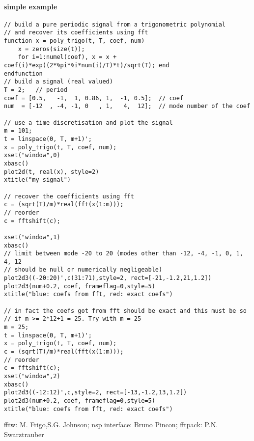 \begin{examples}
 \paragraph{simple example}
  \begin{Verbatim}
// build a pure periodic signal from a trigonometric polynomial
// and recover its coefficients using fft
function x = poly_trigo(t, T, coef, num)
    x = zeros(size(t));
    for i=1:numel(coef), x = x + coef(i)*exp((2*%pi*%i*num(i)/T)*t)/sqrt(T); end
endfunction
// build a signal (real valued)
T = 2;   // period
coef = [0.5,   -1,  1, 0.86, 1,  -1, 0.5];  // coef
num  = [-12  , -4, -1, 0   , 1,   4,  12];  // mode number of the coef

// use a time discretisation and plot the signal
m = 101;
t = linspace(0, T, m+1)';
x = poly_trigo(t, T, coef, num);
xset("window",0)
xbasc()
plot2d(t, real(x), style=2)
xtitle("my signal")

// recover the coefficients using fft
c = (sqrt(T)/m)*real(fft(x(1:m)));
// reorder
c = fftshift(c);

xset("window",1)
xbasc()
// limit between mode -20 to 20 (modes other than -12, -4, -1, 0, 1, 4, 12
// should be null or numerically negligeable)
plot2d3((-20:20)',c(31:71),style=2, rect=[-21,-1.2,21,1.2])
plot2d3(num+0.2, coef, frameflag=0,style=5)
xtitle("blue: coefs from fft, red: exact coefs")

// in fact the coefs got from fft should be exact and this must be so
// if m >= 2*12+1 = 25. Try with m = 25
m = 25;
t = linspace(0, T, m+1)';
x = poly_trigo(t, T, coef, num);
c = (sqrt(T)/m)*real(fft(x(1:m)));
// reorder
c = fftshift(c);
xset("window",2)
xbasc()
plot2d3((-12:12)',c,style=2, rect=[-13,-1.2,13,1.2])
plot2d3(num+0.2, coef, frameflag=0,style=5)
xtitle("blue: coefs from fft, red: exact coefs")
  \end{Verbatim}
 \end{examples}

\begin{authors}
   fftw: M. Frigo,S.G. Johnson;  nsp interface: Bruno Pincon; fftpack: P.N. Swarztrauber
\end{authors}
